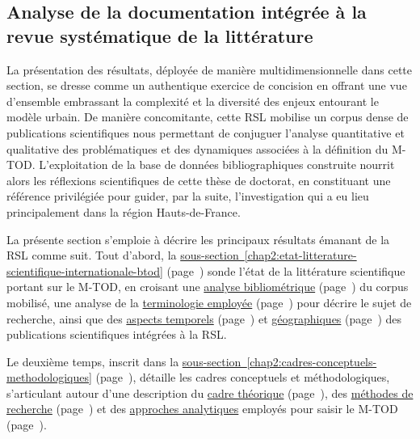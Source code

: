 \begin{refsegment}
    \newpage
\section{Analyse de la documentation intégrée à la revue systématique de la littérature
    \label{chap2:analyse-documentation-rsl}
    }

La présentation des résultats, déployée de manière multidimensionnelle dans cette section, se dresse comme un authentique exercice de concision en offrant une vue d'ensemble embrassant la complexité et la diversité des enjeux entourant le modèle urbain. De manière concomitante, cette \acrshort{RSL} mobilise un corpus dense de publications scientifiques nous permettant de conjuguer l'analyse quantitative et qualitative des problématiques et des dynamiques associées à la définition du \acrshort{M-TOD}. L'exploitation de la base de données bibliographiques construite nourrit alors les réflexions scientifiques de cette thèse de doctorat, en constituant une référence privilégiée pour guider, par la suite, l'investigation qui a eu lieu principalement dans la région Hauts-de-France.%

La présente section s'emploie à décrire les principaux résultats émanant de la \acrshort{RSL} comme suit. Tout d'abord, la \hyperref[chap2:etat-litterature-scientifique-internationale-btod]{sous-section~\ref{chap2:etat-litterature-scientifique-internationale-btod}} (page~\pageref{chap2:etat-litterature-scientifique-internationale-btod}) sonde l'état de la littérature scientifique portant sur le \acrshort{M-TOD}, en croisant une \hyperref[chap2:analyse-bibliometrique]{analyse bibliométrique} (page~\pageref{chap2:analyse-bibliometrique}) du corpus mobilisé, une analyse de la \hyperref[chap2:analyse-textuelle]{terminologie employée} (page~\pageref{chap2:analyse-textuelle}) pour décrire le sujet de recherche, ainsi que des \hyperref[chap2:evolution-recherches-tc-mobilite-individuelle-legere]{aspects temporels} (page~\pageref{chap2:evolution-recherches-tc-mobilite-individuelle-legere}) et \hyperref[chap2:exploration-terrains-geographiques]{géographiques} (page~\pageref{chap2:exploration-terrains-geographiques}) des publications scientifiques intégrées à la \acrshort{RSL}.%

Le deuxième temps, inscrit dans la \hyperref[chap2:cadres-conceptuels-methodologiques]{sous-section~\ref{chap2:cadres-conceptuels-methodologiques}} (page~\pageref{chap2:cadres-conceptuels-methodologiques}), détaille les cadres conceptuels et méthodologiques, s'articulant autour d'une description du \hyperref[chap2:fondements-theoriques]{cadre théorique} (page~\pageref{chap2:fondements-theoriques}), des \hyperref[chap2:methodes-collecte-donnees]{méthodes de recherche} (page~\pageref{chap2:methodes-collecte-donnees}) et des \hyperref[chap2:demarches-types-analyses]{approches analytiques} employés pour saisir le \acrshort{M-TOD} (page~\pageref{chap2:demarches-types-analyses}).%


\end{refsegment}
